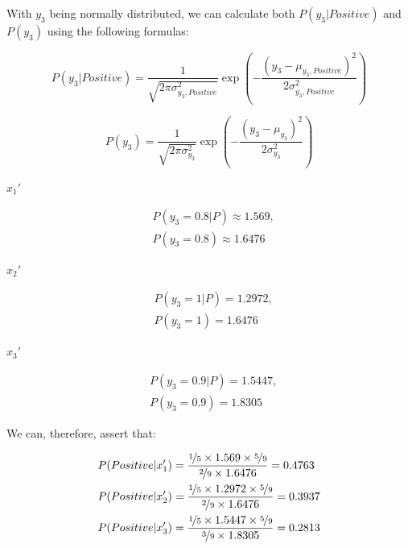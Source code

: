 \documentclass[12pt]{article}
\begin{document}
\begin{enumerate}[leftmargin=\labelsep]
        With $y_3$ being normally distributed, we can calculate both $P(y_3| Positive)$ and $P(y_3)$
        using the following formulas:

        $$
          P(y_3| Positive) = \frac{1}{\sqrt{2 \pi \sigma_{y_3, Positive}^2}} \exp \left( - \frac{(y_3 - \mu_{y_3, Positive})^2}{2 \sigma_{y_3, Positive}^2} \right)
        $$

        $$
          P(y_3) = \frac{1}{\sqrt{2 \pi \sigma_{y_3}^2}} \exp \left( - \frac{(y_3 - \mu_{y_3})^2}{2 \sigma_{y_3}^2} \right)
        $$

        \begin{multicols}{3}
          \setlength{\columnseprule}{1pt}
          \def\columnseprulecolor{\color{black}}
          \centering

          $x_1'$

          $$
            \begin{aligned}
               & P(y_3 = 0.8 | P) \approx 1.569, \\
               & P(y_3 = 0.8) \approx 1.6476
            \end{aligned}
          $$

          \columnbreak

          $x_2'$

          $$
            \begin{aligned}
               & P(y_3 = 1 | P) = 1.2972, \\
               & P(y_3 = 1) = 1.6476
            \end{aligned}
          $$

          \columnbreak

          $x_3'$

          $$
            \begin{aligned}
               & P(y_3 = 0.9 | P) = 1.5447, \\
               & P(y_3 = 0.9) = 1.8305
            \end{aligned}
          $$

        \end{multicols}

        We can, therefore, assert that:

        \begin{align*}
          P(Positive | x_1') & = \frac{\nicefrac{1}{5} \times 1.569 \times \nicefrac{5}{9}}{\nicefrac{2}{9} \times 1.6476} = 0.4763  \\
          P(Positive | x_2') & = \frac{\nicefrac{1}{5} \times 1.2972 \times \nicefrac{5}{9}}{\nicefrac{2}{9} \times 1.6476} = 0.3937 \\
          P(Positive | x_3') & = \frac{\nicefrac{1}{5} \times 1.5447 \times \nicefrac{5}{9}}{\nicefrac{3}{9} \times 1.8305} = 0.2813
        \end{align*}


\end{enumerate}
\end{document}
